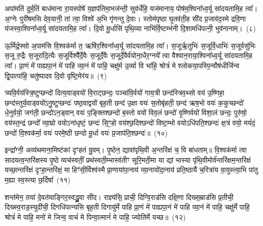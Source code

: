 अपा॑मतिं दुर्म॒तिं बाध॑माना रा॒यस्पोषे॑ य॒ज्ञप॑तिमा॒भज॑न्ती॒ सुव॑र्धेहि॒ यज॑मानाय॒ पोष॑म॒श्विना᳚ध्व॒र्यू सा॑दयतामि॒ह त्वा᳚। अ॒ग्नेः पुरी॑षमसि देव॒यानी॒ तां त्वा॒ विश्वे॑ अ॒भि गृ॑णन्तु दे॒वाः। स्तोम॑पृष्ठा घृ॒तव॑ती॒ह सी॑द प्र॒जाव॑द॒स्मे द्रवि॒णा य॑जस्वा॒श्विना᳚ध्व॒र्यू सा॑दयतामि॒ह त्वा᳚। दि॒वो मू॒र्धासि॑ पृथि॒व्या नाभि॑र्वि॒ष्टम्भ॑नी दि॒शामधि॑पत्नी॒ भुव॑नानाम्।~(८)

ऊ॒र्मिर्द्र॒फ्सो अ॒पाम॑सि वि॒श्वक॑र्मा त॒ ऋषि॑र॒श्विना᳚ध्व॒र्यू सा॑दयतामि॒ह त्वा᳚। स॒जूर्\mbox{}ऋ॒तुभिः॑ स॒जूर्वि॒धाभिः॑ स॒जूर्वसु॑भिः स॒जू रु॒द्रैः स॒जूरा॑दि॒त्यैः स॒जूर्विश्वै᳚र्दे॒वैः स॒जूर्दे॒वैः स॒जूर्दे॒वैर्व॑योना॒धैर॒ग्नये᳚ त्वा वैश्वान॒राया॒श्विना᳚ध्व॒र्यू सा॑दयतामि॒ह त्वा᳚। प्रा॒णं मे॑ पाह्यपा॒नं मे॑ पाहि व्या॒नं मे॑ पाहि॒ चक्षु॑र्म उ॒र्व्या वि भा॑हि॒ श्रोत्रं॑ मे श्लोकया॒पस्पि॒न्वौष॑धीर्जिन्व द्वि॒पात्पा॑हि॒ चतु॑ष्पादव दि॒वो वृष्टि॒मेर॑य॥~(९)

{\anuvakamend[{सु॒वीरं॒ भुव॑नानामु॒र्व्या स॒प्तद॑श च}]}%

त्र्यवि॒र्वय॑स्त्रि॒ष्टुप्छन्दो॑ दित्य॒वाड्वयो॑ वि॒राट्छन्दः॒ पञ्चा॑वि॒र्वयो॑ गाय॒त्री छन्द॑स्त्रिव॒थ्सो वय॑ उ॒ष्णिहा॒ छन्द॑स्तुर्य॒वाड्वयो॑\-ऽ\-नु॒ष्टुप्छन्दः॑ पष्ठ॒वाद्वयो॑ बृह॒ती छन्द॑ उ॒क्षा वयः॑ स॒तोबृ॑हती॒ छन्द॑ ऋष॒भो वयः॑ क॒कुच्छन्दो॑ धे॒नुर्वयो॒ जग॑ती॒ छन्दो॑\-ऽ\-न॒ड्वान् वयः॑ प॒ङ्क्तिश्छन्दो॑ ब॒स्तो वयो॑ विव॒लं छन्दो॑ वृ॒ष्णिर्वयो॑ विशा॒लं छन्दः॒ पुरु॑षो॒ वय॑स्त॒न्द्रं छन्दो᳚ व्या॒घ्रो वयो\-ऽ\-ना॑धृष्टं॒ छन्दः॑ सि॒ꣳ॒हो वय॑श्छ॒दिश्छन्दो॑ विष्ट॒म्भो वयो\-ऽधि॑पति॒श्छन्दः॑ क्ष॒त्रं वयो॒ मयं॑दं॒ छन्दो॑ वि॒श्वक॑र्मा॒ वयः॑ परमे॒ष्ठी छन्दो मू॒र्धा वयः॑ प्र॒जा\-प॑ति॒श्छन्दः॑॥~(१०)

{\anuvakamend[{पुरु॑षो॒ वयः॒ षड्विꣳ॑शतिश्च}]}%

इन्द्रा᳚ग्नी॒ अव्य॑थमाना॒मिष्ट॑कां दृꣳहतं यु॒वम्। पृ॒ष्ठेन॒ द्यावा॑पृथि॒वी अ॒न्तरि॑क्षं च॒ वि बा॑धताम्॥ वि॒श्वक॑र्मा त्वा सादयत्व॒न्तरि॑क्षस्य पृ॒ष्ठे व्यच॑स्वतीं॒ प्रथ॑स्वती॒म्भास्व॑तीꣳ सूरि॒मती॒मा या द्यां भास्या पृ॑थि॒वीमोर्व॑न्तरि॑क्षम॒न्तरि॑क्षं यच्छा॒न्तरि॑क्षं दृꣳहा॒न्तरि॑क्षं॒ मा हिꣳ॑सी॒र्विश्व॑स्मै प्रा॒णाया॑पा॒नाय॑ व्या॒नायो॑दा॒नाय॑ प्रति॒ष्ठायै॑ च॒रित्रा॑य वा॒युस्त्वा॒भि पा॑तु म॒ह्या स्व॒स्त्या छ॒र्दिषा᳚~(११)

शन्त॑मेन॒ तया॑ दे॒वत॑याङ्गिर॒स्वद्ध्रु॒वा सी॑द। राज्ञ्य॑सि॒ प्राची॒ दिग्वि॒राड॑सि दक्षि॒णा दिख्स॒म्राड॑सि प्र॒तीची॒ दिख्स्व॒राड॒स्युदी॑ची॒ दिगधि॑पत्न्यसि बृह॒ती दिगायु॑र्मे पाहि प्रा॒णं मे॑ पाह्यपा॒नं मे॑ पाहि व्या॒नं मे॑ पाहि॒ चक्षु॑र्मे पाहि॒ श्रोत्रं॑ मे पाहि॒ मनो॑ मे जिन्व॒ वाचं॑ मे पिन्वा॒त्मानं॑ मे पाहि॒ ज्योति॑र्मे यच्छ॥~(१२)

